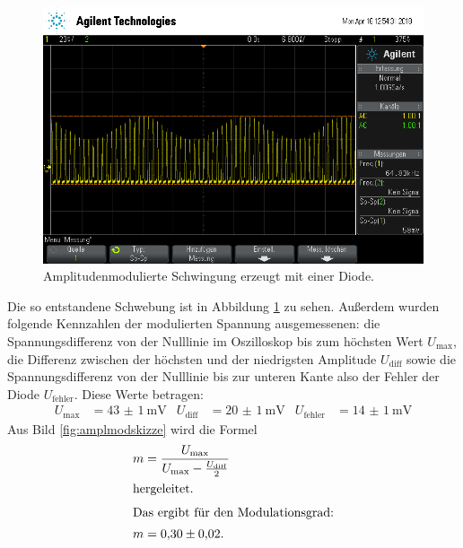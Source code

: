 \begin{figure}[h]
  \centering
  \includegraphics[width=.9\textwidth]{Oszi_Pics/amplModDiode.png}
  \caption{Amplitudenmodulierte Schwingung erzeugt mit einer Diode.}
  \label{fig:amplModDiode}
\end{figure}

Die so entstandene Schwebung ist in Abbildung \ref{fig:amplModDiode} zu sehen.
Außerdem wurden folgende Kennzahlen der modulierten Spannung ausgemessenen:
die Spannungsdifferenz von der Nulllinie im Oszilloskop bis zum höchsten Wert $U_\text{max}$, die Differenz zwischen der höchsten und der niedrigsten Amplitude $U_\text{diff}$ sowie die Spannungsdifferenz von der Nulllinie bis zur unteren Kante also der Fehler der Diode $U_\text{fehler}$.
Diese Werte betragen:
\begin{align*}
  U_\text{max} &= \SI{43(1)}{\milli\volt} & U_\text{diff} &= \SI{20(1)}{\milli\volt}  & U_\text{fehler} &= \SI{14(1)}{\milli\volt}
\end{align*}
Aus Bild \ref{fig:amplmodskizze} wird die Formel
\begin{align}
  m &= \frac{U_\text{max}}{U_\text{max} - \frac{U_\text{diff}}{2}}\\
  \intertext{hergeleitet.}
  \intertext{Das ergibt für den Modulationsgrad:}
  m &= \num{0.30(2)}.
\end{align}

